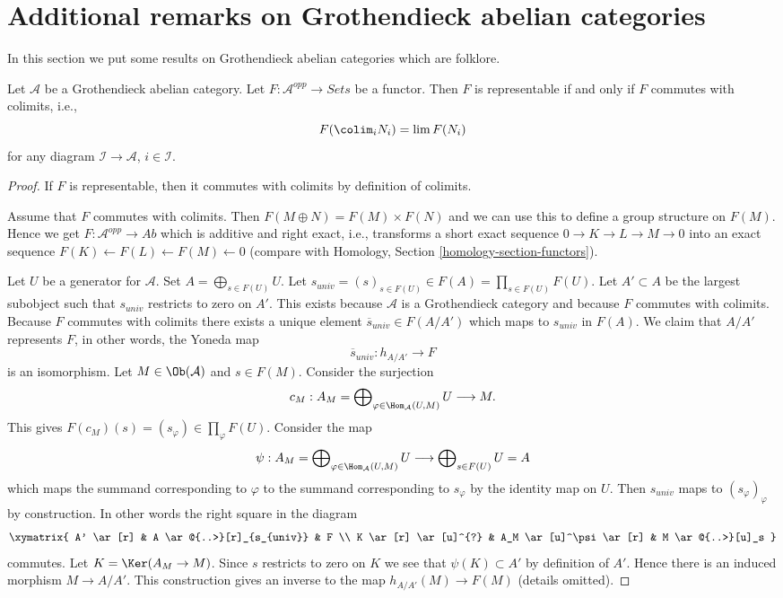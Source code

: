 \section{Additional remarks on Grothendieck abelian categories}
\label{section-additional-Grothendieck}

\noindent
In this section we put some results on Grothendieck abelian categories
which are folklore.

\begin{lemma}
\label{lemma-grothendieck-brown}
Let $\mathcal{A}$ be a Grothendieck abelian category.
Let $F : \mathcal{A}^{opp} \to \textit{Sets}$ be a functor.
Then $F$ is representable if and only if $F$ commutes with colimits, i.e.,
$$
F(\colim_i N_i) = \lim F(N_i)
$$
for any diagram $\mathcal{I} \to \mathcal{A}$, $i \in \mathcal{I}$.
\end{lemma}

\begin{proof}
If $F$ is representable, then it commutes with colimits by definition
of colimits.

\medskip\noindent
Assume that $F$ commutes with colimits. Then $F(M \oplus N) = F(M) \times F(N)$
and we can use this to define a group structure on $F(M)$. Hence we get
$F : \mathcal{A}^{opp} \to \textit{Ab}$ which is additive and right exact, i.e.,
transforms a short exact sequence $0 \to K \to L \to M \to 0$ into an exact
sequence $F(K) \leftarrow F(L) \leftarrow F(M) \leftarrow 0$ (compare with
Homology, Section \ref{homology-section-functors}).

\medskip\noindent
Let $U$ be a generator for $\mathcal{A}$. Set $A = \bigoplus_{s \in F(U)} U$.
Let $s_{univ} = (s)_{s \in F(U)} \in F(A) = \prod_{s \in F(U)} F(U)$. Let
$A' \subset A$ be the largest subobject such that $s_{univ}$ restricts to
zero on $A'$. This exists because $\mathcal{A}$ is a Grothendieck category
and because $F$ commutes with colimits. Because $F$ commutes with colimits
there exists a unique element $\overline{s}_{univ} \in F(A/A')$ which
maps to $s_{univ}$ in $F(A)$. We claim that $A/A'$ represents $F$, in
other words, the Yoneda map
$$
\overline{s}_{univ} : h_{A/A'} \longrightarrow F
$$
is an isomorphism. Let $M \in \Ob(\mathcal{A})$ and $s \in F(M)$. Consider
the surjection
$$
c_M :
A_M = \bigoplus\nolimits_{\varphi \in \Hom_\mathcal{A}(U, M)} U
\longrightarrow
M.
$$
This gives $F(c_M)(s) = (s_\varphi) \in \prod_\varphi F(U)$.
Consider the map
$$
\psi :
A_M = \bigoplus\nolimits_{\varphi \in \Hom_\mathcal{A}(U, M)} U
\longrightarrow
\bigoplus\nolimits_{s \in F(U)} U = A
$$
which maps the summand corresponding to $\varphi$ to the summand
corresponding to $s_\varphi$ by the identity map on $U$. Then $s_{univ}$
maps to $(s_\varphi)_\varphi$ by construction.
In other words the right square in the diagram
$$
\xymatrix{
A' \ar[r] &
A \ar@{..>}[r]_{s_{univ}} & F \\
K \ar[r] \ar[u]^{?} & A_M \ar[u]^\psi \ar[r] &
M \ar@{..>}[u]_s
}
$$
commutes. Let $K = \Ker(A_M \to M)$. Since $s$ restricts to zero
on $K$ we see that $\psi(K) \subset A'$ by definition of $A'$. Hence there
is an induced morphism $M \to A/A'$. This construction gives an inverse
to the map $h_{A/A'}(M) \to F(M)$ (details omitted).
\end{proof}

